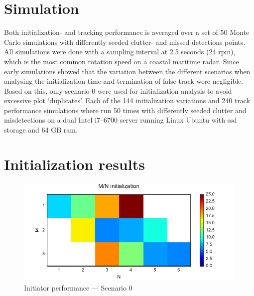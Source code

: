 \section{Simulation}
Both initialization- and tracking performance is averaged over a set of 50 Monte Carlo simulations with differently seeded clutter- and missed detections points. All simulations were done with a sampling interval at 2.5 seconds (24 \gls{rpm}), which is the most common rotation speed on a coastal maritime radar. Since early simulations showed that the variation between the different scenarios when analysing the initialization time and termination of false track were negligible. Based on this, only scenario 0 were used for initialization analysis to avoid excessive plot `duplicates'. Each of the 144 initialization variations and 240 track performance simulations where run 50 times with differently seeded clutter and misdetections on a dual Intel i7--6700 server running Linux Ubuntu with \gls{ssd} storage and 64 GB \gls{ram}.

\section{Initialization results}
\begin{figure}[H]
 \centering
 \includegraphics{Figures/plots/Scenario0_Init-Performance.pdf}
 \caption{Initiator performance --- Scenario 0}\label{fig:init_performance_scenario0}
\end{figure}

